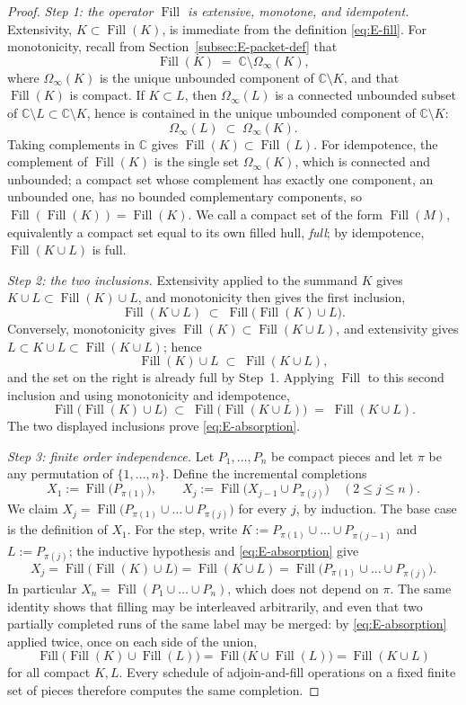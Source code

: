 \documentclass[11pt,reqno]{amsart}
\theoremstyle{definition}
\theoremstyle{remark}
\newcommand{\C}{\mathbb C}
\newcommand{\Fill}{\operatorname{Fill}}
\begin{document}
\begin{proof}
\emph{Step 1: the operator $\Fill$ is extensive, monotone, and idempotent.}
Extensivity, $K\subset\Fill(K)$, is immediate from the definition
\eqref{eq:E-fill}. For monotonicity, recall from Section~\ref{subsec:E-packet-def}
that
\[
\Fill(K)\;=\;\C\setminus\Omega_\infty(K),
\]
where $\Omega_\infty(K)$ is the unique unbounded component of $\C\setminus K$, and
that $\Fill(K)$ is compact. If $K\subset L$, then $\Omega_\infty(L)$ is a connected
unbounded subset of $\C\setminus L\subset\C\setminus K$, hence is contained in the
unique unbounded component of $\C\setminus K$:
\[
\Omega_\infty(L)\;\subset\;\Omega_\infty(K).
\]
Taking complements in $\C$ gives $\Fill(K)\subset\Fill(L)$. For idempotence, the
complement of $\Fill(K)$ is the single set $\Omega_\infty(K)$, which is connected and
unbounded; a compact set whose complement has exactly one component, an unbounded
one, has no bounded complementary components, so $\Fill(\Fill(K))=\Fill(K)$. We call
a compact set of the form $\Fill(M)$, equivalently a compact set equal to its own
filled hull, \emph{full}; by idempotence, $\Fill(K\cup L)$ is full.

\emph{Step 2: the two inclusions.}
Extensivity applied to the summand $K$ gives $K\cup L\subset\Fill(K)\cup L$, and
monotonicity then gives the first inclusion,
\[
\Fill(K\cup L)\;\subset\;\Fill\bigl(\Fill(K)\cup L\bigr).
\]
Conversely, monotonicity gives $\Fill(K)\subset\Fill(K\cup L)$, and extensivity gives
$L\subset K\cup L\subset\Fill(K\cup L)$; hence
\[
\Fill(K)\cup L\;\subset\;\Fill(K\cup L),
\]
and the set on the right is already full by Step~1. Applying $\Fill$ to this second
inclusion and using monotonicity and idempotence,
\[
\Fill\bigl(\Fill(K)\cup L\bigr)\;\subset\;\Fill\bigl(\Fill(K\cup L)\bigr)
\;=\;\Fill(K\cup L).
\]
The two displayed inclusions prove \eqref{eq:E-absorption}.

\emph{Step 3: finite order independence.}
Let $P_1,\dots,P_n$ be compact pieces and let $\pi$ be any permutation of
$\{1,\dots,n\}$. Define the incremental completions
\[
X_1:=\Fill\bigl(P_{\pi(1)}\bigr),
\qquad
X_j:=\Fill\bigl(X_{j-1}\cup P_{\pi(j)}\bigr)\quad(2\le j\le n).
\]
We claim $X_j=\Fill\bigl(P_{\pi(1)}\cup\dots\cup P_{\pi(j)}\bigr)$ for every $j$, by
induction. The base case is the definition of $X_1$. For the step, write
$K:=P_{\pi(1)}\cup\dots\cup P_{\pi(j-1)}$ and $L:=P_{\pi(j)}$; the inductive
hypothesis and \eqref{eq:E-absorption} give
\[
X_j=\Fill\bigl(\Fill(K)\cup L\bigr)=\Fill(K\cup L)
=\Fill\bigl(P_{\pi(1)}\cup\dots\cup P_{\pi(j)}\bigr).
\]
In particular $X_n=\Fill(P_1\cup\dots\cup P_n)$, which does not depend on $\pi$. The
same identity shows that filling may be interleaved arbitrarily, and even that two
partially completed runs of the same label may be merged: by
\eqref{eq:E-absorption} applied twice, once on each side of the union,
\[
\Fill\bigl(\Fill(K)\cup\Fill(L)\bigr)
=\Fill\bigl(K\cup\Fill(L)\bigr)
=\Fill(K\cup L)
\]
for all compact $K,L$. Every schedule of adjoin-and-fill operations on a fixed finite
set of pieces therefore computes the same completion.
\end{proof}
\end{document}
